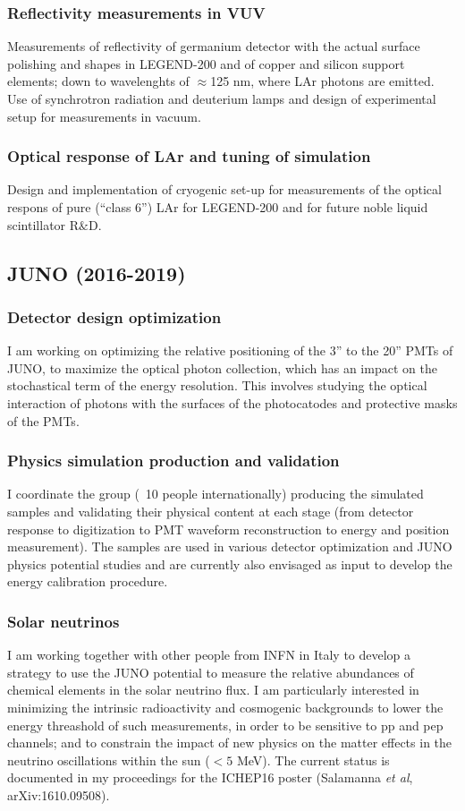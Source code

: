 \documentclass{article}
\begin{document}
\begin{vita}
\subsubsection*{Reflectivity measurements in VUV}
Measurements of reflectivity of germanium detector with the actual surface polishing and shapes in LEGEND-200 and of copper and silicon support elements; down to wavelenghts of $\approx$125 nm, where LAr photons are emitted. Use of synchrotron radiation and deuterium lamps and design of experimental setup for measurements in vacuum. 

\subsubsection*{Optical response of LAr and tuning of simulation}
Design and implementation of cryogenic set-up for measurements of the optical respons of pure (``class 6'') LAr for LEGEND-200 and for future noble liquid scintillator R$\&$D.

\subsection*{JUNO (2016-2019)}
\subsubsection*{Detector design optimization}
I am working on optimizing the relative positioning of the 3'' to the 20'' PMTs of JUNO, to maximize the optical photon collection, which has an impact on the stochastical term of the energy resolution. This involves studying the optical interaction of photons with the surfaces of the photocatodes and protective masks of the PMTs.

\subsubsection*{Physics simulation production and validation}
I coordinate the group (~10 people internationally) producing the simulated samples and validating their physical content at each stage (from detector response to digitization to PMT waveform reconstruction to energy and position measurement). The samples are used in various detector optimization and JUNO physics potential studies and are currently also envisaged as input to develop the energy calibration procedure. 

\subsubsection*{Solar neutrinos}
I am working together with other people from INFN in Italy to develop a strategy to use the JUNO potential to measure the relative abundances of chemical elements in the solar neutrino flux. I am particularly interested in minimizing the intrinsic radioactivity and cosmogenic backgrounds to lower the energy threashold of such measurements, in order to be sensitive to pp and pep channels; and to constrain the impact of new physics on the matter effects in the neutrino oscillations within the sun ($<5$ MeV). The current status is documented in my proceedings for the ICHEP16 poster (Salamanna {\it et al}, arXiv:1610.09508).


\end{vita}
\end{document}
